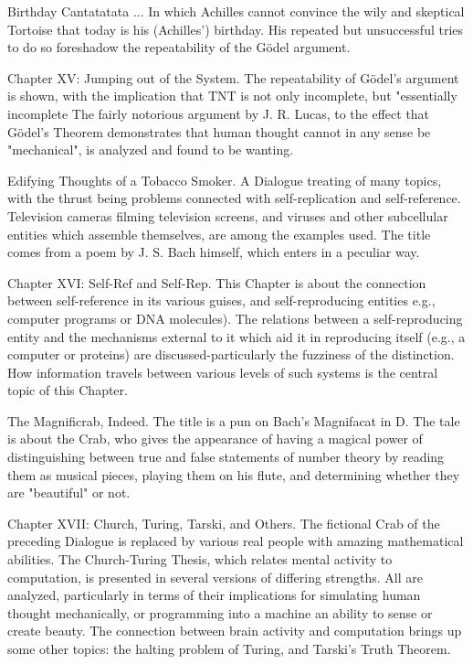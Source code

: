 Birthday Cantatatata ... In which Achilles cannot convince the wily and skeptical Tortoise that today
   is his (Achilles') birthday. His repeated but unsuccessful tries to do so foreshadow the
   repeatability of the Gödel argument.

Chapter XV: Jumping out of the System. The repeatability of Gödel’s argument is shown, with
  the implication that TNT is not only incomplete, but "essentially incomplete The fairly notorious
  argument by J. R. Lucas, to the effect that Gödel’s Theorem demonstrates that human thought
  cannot in any sense be "mechanical", is analyzed and found to be wanting.

Edifying Thoughts of a Tobacco Smoker. A Dialogue treating of many topics, with the thrust being
   problems connected with self-replication and self-reference. Television cameras filming
   television screens, and viruses and other subcellular entities which assemble themselves, are
   among the examples used. The title comes from a poem by J. S. Bach himself, which enters in a
   peculiar way.

Chapter XVI: Self-Ref and Self-Rep. This Chapter is about the connection between self-reference
  in its various guises, and self-reproducing entities e.g., computer programs or DNA molecules).
  The relations between a self-reproducing entity and the mechanisms external to it which aid it in
  reproducing itself (e.g., a computer or proteins) are discussed-particularly the fuzziness of the
  distinction. How information travels between various levels of such systems is the central topic of
  this Chapter.

The Magnificrab, Indeed. The title is a pun on Bach's Magnifacat in D. The tale is about the Crab,
   who gives the appearance of having a magical power of distinguishing between true and false
   statements of number theory by reading them as musical pieces, playing them on his flute, and
   determining whether they are "beautiful" or not.

Chapter XVII: Church, Turing, Tarski, and Others. The fictional Crab of the preceding Dialogue
  is replaced by various real people with amazing mathematical abilities. The Church-Turing
  Thesis, which relates mental activity to computation, is presented in several versions of differing
  strengths. All are analyzed, particularly in terms of their implications for simulating human
  thought mechanically, or programming into a machine an ability to sense or create beauty. The
  connection between brain activity and computation brings up some other topics: the halting
  problem of Turing, and Tarski's Truth Theorem.

